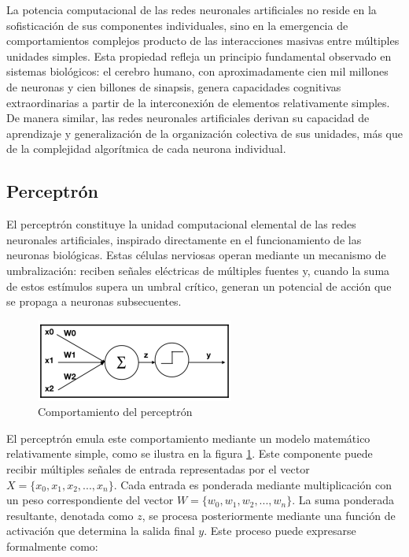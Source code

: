 La potencia computacional de las redes neuronales artificiales no reside en la sofisticación de sus componentes individuales, sino en la emergencia de comportamientos complejos producto de las interacciones masivas entre múltiples unidades simples. Esta propiedad refleja un principio fundamental observado en sistemas biológicos: el cerebro humano, con aproximadamente cien mil millones de neuronas y cien billones de sinapsis, genera capacidades cognitivas extraordinarias a partir de la interconexión de elementos relativamente simples. De manera similar, las redes neuronales artificiales derivan su capacidad de aprendizaje y generalización de la organización colectiva de sus unidades, más que de la complejidad algorítmica de cada neurona individual.
%

\subsection{Perceptrón}
%

El perceptrón constituye la unidad computacional elemental de las redes neuronales artificiales, inspirado directamente en el funcionamiento de las neuronas biológicas. Estas células nerviosas operan mediante un mecanismo de umbralización: reciben señales eléctricas de múltiples fuentes y, cuando la suma de estos estímulos supera un umbral crítico, generan un potencial de acción que se propaga a neuronas subsecuentes.
%

\begin{figure}[H]
    \centering
    \includegraphics{capitulos/img/perceptron.png}
    \caption{Comportamiento del perceptrón}
    \label{fig:perceptron}
\end{figure}
%

El perceptrón emula este comportamiento mediante un modelo matemático relativamente simple, como se ilustra en la figura \ref{fig:perceptron}. Este componente puede recibir múltiples señales de entrada representadas por el vector \(X = \{x_{0},x_{1},x_{2},...,x_{n}\}\). Cada entrada es ponderada mediante multiplicación con un peso correspondiente del vector \(W = \{w_{0},w_{1},w_{2},...,w_{n}\}\). La suma ponderada resultante, denotada como \(z\), se procesa posteriormente mediante una función de activación que determina la salida final \(y\). Este proceso puede expresarse formalmente como:
%

